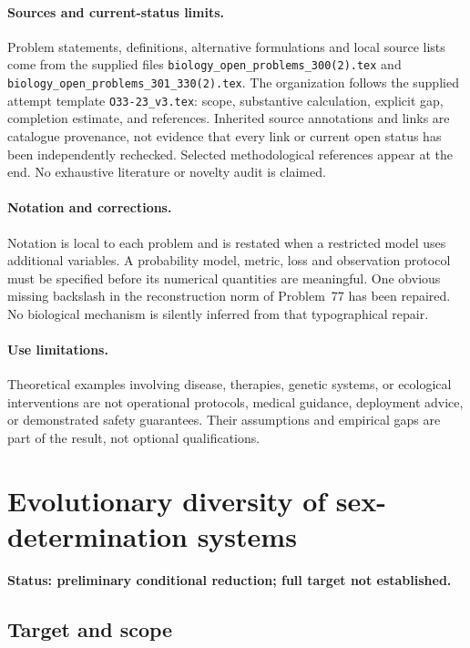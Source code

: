 \documentclass[11pt]{article}
\begin{document}
\paragraph{Sources and current-status limits.}
Problem statements, definitions, alternative formulations and local source lists
come from the supplied files
\texttt{biology\_open\_problems\_300(2).tex} and
\texttt{biology\_open\_problems\_301\_330(2).tex}.
The organization follows the supplied attempt template
\texttt{O33-23\_v3.tex}: scope, substantive calculation, explicit gap,
completion estimate, and references. Inherited source annotations and links are
catalogue provenance, not evidence that every link or current open status has
been independently rechecked. Selected methodological references appear at the
end. No exhaustive literature or novelty audit is claimed.

\paragraph{Notation and corrections.}
Notation is local to each problem and is restated when a restricted model uses
additional variables. A probability model, metric, loss and observation protocol
must be specified before its numerical quantities are meaningful. One obvious
missing backslash in the reconstruction norm of Problem~77 has been repaired.
No biological mechanism is silently inferred from that typographical repair.

\paragraph{Use limitations.}
Theoretical examples involving disease, therapies, genetic systems, or ecological
interventions are not operational protocols, medical guidance, deployment advice,
or demonstrated safety guarantees. Their assumptions and empirical gaps are part
of the result, not optional qualifications.


\section*{Evolutionary diversity of sex-determination systems}
\label{prob:324}
\noindent\textbf{Status: preliminary conditional reduction; full target not established.}
\subsection{Target and scope}
\end{document}
